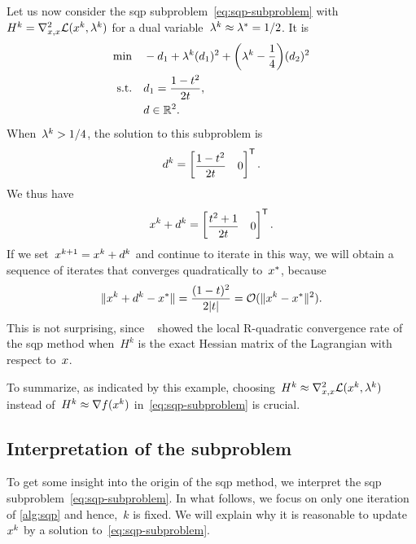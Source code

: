 Let us now consider the \gls{sqp} subproblem~\cref{eq:sqp-subproblem} with~$H^k = \nabla_{x, x}^2 \lag(\iter[k], \lm[k])$ for a dual variable~$\lm[k] \approx \lm[\ast] = 1/2$.
It is
\begin{align*}
    \min        & \quad -\step_1 + \lm[k] (\step_1)^2 + \bigg( \lm[k] - \frac{1}{4} \bigg) (\step_2)^2\\
    \text{s.t.} & \quad \step_1 = \frac{1 - t^2}{2 t},\\
                & \quad \step \in \R^2. \nonumber
\end{align*}
When~$\lm[k] > 1/4$, the solution to this subproblem is
\begin{equation*}
    \step[k] =
    \begin{bmatrix}
        \dfrac{1 - t^2}{2 t}    & 0
    \end{bmatrix}^{\T}.
\end{equation*}
We thus have
\begin{equation*}
    \iter[k] + \step[k] = 
    \begin{bmatrix}
        \dfrac{t^2 + 1}{2 t}  & 0
    \end{bmatrix}^{\T}.
\end{equation*}
If we set~$\iter[k + 1] = \iter[k] + \step[k]$ and continue to iterate in this way, we will obtain a sequence of iterates that converges quadratically to~$\iter[\ast]$, because
\begin{equation*}
    \norm{\iter[k] + \step[k] - \iter[\ast]} = \frac{(1 - t)^2}{2 \abs{t}} = \bigo(\norm{\iter[k] - \iter[\ast]}^2).
\end{equation*}
This is not surprising, since \citeauthor{Robinson_1974}~\cite{Robinson_1974} showed the local R-quadratic convergence rate of the \gls{sqp} method when~$H^k$ is the exact Hessian matrix of the Lagrangian with respect to~$\iter$.

To summarize, as indicated by this example, choosing~$H^k \approx \nabla_{x, x}^2 \lag(\iter[k], \lm[k])$ instead of~$H^k \approx \nabla \obj(\iter[k])$ in~\cref{eq:sqp-subproblem} is crucial.

\subsection{Interpretation of the  subproblem}
\label{subsec:sqp-interpretation}

To get some insight into the origin of the \gls{sqp} method, we interpret the \gls{sqp} subproblem~\cref{eq:sqp-subproblem}.
In what follows, we focus on only one iteration of \cref{alg:sqp} and hence,~$k$ is fixed.
We will explain why it is reasonable to update~$\iter[k]$ by a solution to~\cref{eq:sqp-subproblem}.

